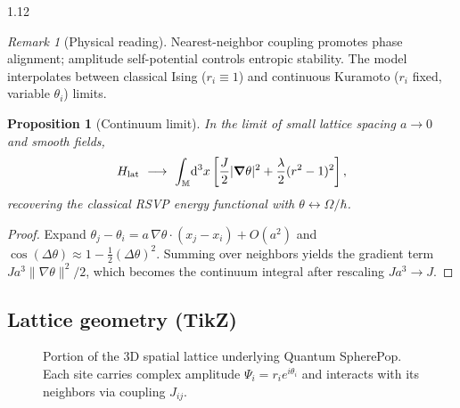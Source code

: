 \documentclass[12pt,a4paper]{article}
\numberwithin{equation}{section}
\newtheorem{proposition}{Proposition}[section]
\theoremstyle{remark}
\newtheorem{remark}{Remark}[section]
\theoremstyle{definition}
\newcommand{\M}{\mathbb{M}}
\begin{document}
\begin{spacing}{1.12}
\begin{remark}[Physical reading]
Nearest-neighbor coupling promotes phase alignment; amplitude self-potential controls entropic stability.
The model interpolates between classical Ising ($r_i\equiv1$) and continuous Kuramoto ($r_i$ fixed, variable $\theta_i$) limits.
\end{remark}

\begin{proposition}[Continuum limit]
\label{prop:continuum}
In the limit of small lattice spacing $a\to0$ and smooth fields,
\[
H_{\mathrm{lat}}\ \longrightarrow\
\int_{\M}\!\dd^3x
\left[
\frac{J}{2}|\grad\theta|^2
+\frac{\lambda}{2}(r^2-1)^2
\right],
\]
recovering the classical RSVP energy functional with $\theta\leftrightarrow\Omega/\hbar$.
\end{proposition}

\begin{proof}
Expand $\theta_j-\theta_i=a\,\nabla\theta\!\cdot\!(x_j-x_i)+O(a^2)$ and $\cos(\Delta\theta)\approx 1-\frac12(\Delta\theta)^2$.
Summing over neighbors yields the gradient term $J a^3 \|\nabla\theta\|^2/2$, which becomes the continuum integral after rescaling $J a^3\to J$.
\end{proof}

\subsection{Lattice geometry (TikZ)}
\label{subsec:lattice-geometry}

\begin{figure}[H]
\centering
{}
\caption{Portion of the 3D spatial lattice underlying Quantum SpherePop.
Each site carries complex amplitude $\Psi_i=r_i e^{i\theta_i}$ and interacts with its neighbors via coupling $J_{ij}$.}
\label{fig:lattice-geometry}
\end{figure}


\end{spacing}
\end{document}
